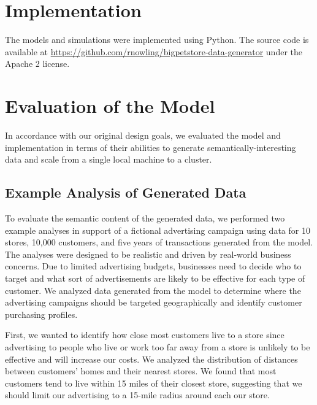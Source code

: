\documentclass[conference]{IEEEtran}
\begin{document}

\section{Implementation}
The models and simulations were implemented using Python. The source code is available at \url{https://github.com/rnowling/bigpetstore-data-generator} under the Apache 2 license.

\section{Evaluation of the Model}
In accordance with our original design goals, we evaluated the model and implementation in terms of their abilities to generate semantically-interesting data and scale from a single local machine to a cluster.

\subsection{Example Analysis of Generated Data}
To evaluate the semantic content of the generated data, we performed two example analyses in support of a fictional advertising campaign using data for 10 stores, 10,000 customers, and five years of transactions generated from the model. The analyses were designed to be realistic and driven by real-world business concerns.  Due to limited advertising budgets, businesses need to decide who to target and what sort of advertisements are likely to be effective for each type of customer.  We analyzed data generated from the model to determine where the advertising campaigns should be targeted geographically and identify customer purchasing profiles.

First, we wanted to identify how close most customers live to a store since advertising to people who live or work too far away from a store is unlikely to be effective and will increase our costs. We analyzed the distribution of distances between customers' homes and their nearest stores.  We found that most customers tend to live within 15 miles of their closest store, suggesting that we should limit our advertising to a 15-mile radius around each our store.
\end{document}
